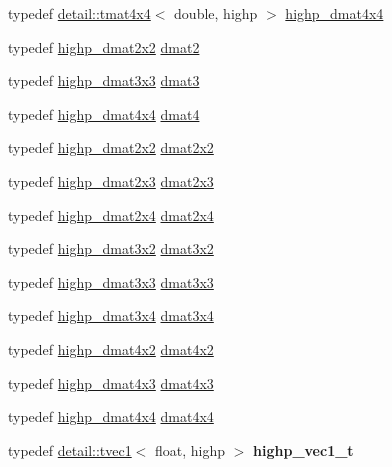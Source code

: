 \begin{DoxyCompactItemize}
\item 
typedef \hyperlink{structglm_1_1detail_1_1tmat4x4}{detail\+::tmat4x4}$<$ double, highp $>$ \hyperlink{group__core__precision_ga1c0a2edbde597b59e9005691a224b208}{highp\+\_\+dmat4x4}
\item 
typedef \hyperlink{group__core__precision_gaa5e35f6570d394c1cd34f411a473220c}{highp\+\_\+dmat2x2} \hyperlink{group__core__types_gad8c130d26c4cd9a1a831c1a74292a8f6}{dmat2}
\item 
typedef \hyperlink{group__core__precision_gad7229dea82287910d88e6e8566e39fc7}{highp\+\_\+dmat3x3} \hyperlink{group__core__types_ga25fd62195c3ef5ac0d32ead1dbfbb929}{dmat3}
\item 
typedef \hyperlink{group__core__precision_ga1c0a2edbde597b59e9005691a224b208}{highp\+\_\+dmat4x4} \hyperlink{group__core__types_ga7f7c1300ebfd19d573e9deb1e8758b54}{dmat4}
\item 
typedef \hyperlink{group__core__precision_gaa5e35f6570d394c1cd34f411a473220c}{highp\+\_\+dmat2x2} \hyperlink{group__core__types_gae9932771e11a4f38e21f1136423bab18}{dmat2x2}
\item 
typedef \hyperlink{group__core__precision_gafec7367665f006f2a7643103c5eddc38}{highp\+\_\+dmat2x3} \hyperlink{group__core__types_ga6b5ff9888ca0e468f35b637d4c3a361d}{dmat2x3}
\item 
typedef \hyperlink{group__core__precision_gacd51d8188f7d66a83c035b8c4cd69f2d}{highp\+\_\+dmat2x4} \hyperlink{group__core__types_ga2d1dd4b4925d1ea67539902c820483a0}{dmat2x4}
\item 
typedef \hyperlink{group__core__precision_gac956fe6b946f0ccee78367ccd5427351}{highp\+\_\+dmat3x2} \hyperlink{group__core__types_ga2db259d2e7921065c5b7d4dca9547960}{dmat3x2}
\item 
typedef \hyperlink{group__core__precision_gad7229dea82287910d88e6e8566e39fc7}{highp\+\_\+dmat3x3} \hyperlink{group__core__types_gaf3c29c4f75a448f308463e75ca2efd4c}{dmat3x3}
\item 
typedef \hyperlink{group__core__precision_gaff199c8d04a8edb92ed43283e8694c59}{highp\+\_\+dmat3x4} \hyperlink{group__core__types_ga19e745a83cba85f57afa1232276dcc96}{dmat3x4}
\item 
typedef \hyperlink{group__core__precision_gaa4fb1ed350a6cd053abb9b093d13ce0d}{highp\+\_\+dmat4x2} \hyperlink{group__core__types_gab3d51ce41e6f0aa267d3e185cee09c44}{dmat4x2}
\item 
typedef \hyperlink{group__core__precision_gaf8aeba0eecc5c651e0f06414b6e37754}{highp\+\_\+dmat4x3} \hyperlink{group__core__types_gaa4a157ac183c5bd5dcbd555a94b1b505}{dmat4x3}
\item 
typedef \hyperlink{group__core__precision_ga1c0a2edbde597b59e9005691a224b208}{highp\+\_\+dmat4x4} \hyperlink{group__core__types_ga54d90d4b902d93638b906571af215bb1}{dmat4x4}
\item 
typedef \hyperlink{structglm_1_1detail_1_1tvec1}{detail\+::tvec1}$<$ float, highp $>$ {\bfseries highp\+\_\+vec1\+\_\+t}\hypertarget{namespaceglm_aa500b77d9369f9121bdd014d0e64c4f2}{}\label{namespaceglm_aa500b77d9369f9121bdd014d0e64c4f2}


\end{DoxyCompactItemize}
